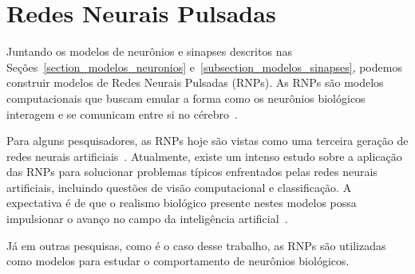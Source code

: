 \section{Redes Neurais Pulsadas}

Juntando os modelos de neurônios e sinapses descritos nas Seções~\ref{section_modelos_neuronios}
e~\ref{subsection_modelos_sinapses}, podemos construir modelos de Redes Neurais Pulsadas (RNPs). As RNPs são modelos
computacionais que buscam emular a forma como os neurônios biológicos interagem e se comunicam entre si no
cérebro~\cite{yamazakiSpiking2022}. 

Para alguns pesquisadores, as RNPs hoje são vistas como uma terceira geração de redes neurais
artificiais~\cite{maassNetworks1997}. Atualmente, existe um intenso estudo sobre a aplicação das RNPs para solucionar problemas
típicos enfrentados pelas redes neurais artificiais, incluindo questões de visão computacional e classificação. A expectativa é de
que o realismo biológico presente nestes modelos possa impulsionar o avanço no campo da inteligência
artificial~\cite{yamazakiSpiking2022}.

Já em outras pesquisas, como é o caso desse trabalho, as RNPs são utilizadas como modelos para estudar o comportamento de
neurônios biológicos.

